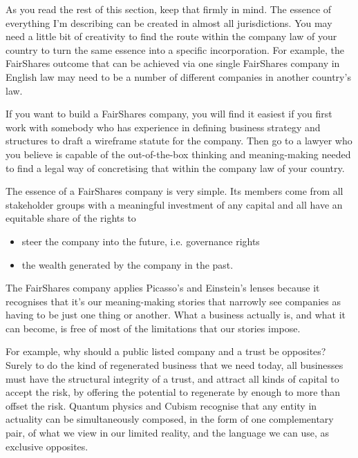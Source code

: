 As you read the rest of this section, keep that firmly in mind. The essence of everything I'm describing can be created in almost all jurisdictions. You may need a little bit of creativity to find the route within the company law of your country to turn the same essence into a specific incorporation. For example, the FairShares outcome that can be achieved via one single FairShares company in English law may need to be a number of different companies in another country's law. 


If you want to build a FairShares company, you will find it easiest if you first work with somebody who has experience in defining business strategy and structures to draft a wireframe statute for the company. Then go to a lawyer who you believe is capable of the out-of-the-box thinking and meaning\hyp{}making needed to find a legal way of concretising that within the company law of your country. 


The essence of a FairShares company is very simple. Its members come from all stakeholder groups with a meaningful investment of any capital and all have an equitable share of the rights to


\begin{itemize}
\item steer the company into the future, i.e. governance rights
\item the wealth generated by the company in the past.
\end{itemize}


The FairShares company applies Picasso's and Einstein's lenses because it recognises that it's our meaning\hyp{}making stories that narrowly see companies as having to be just one thing or another. What a business actually is, and what it can become, is free of most of the limitations that our stories impose.


For example, why should a public listed company and a trust be opposites? Surely to do the kind of regenerated business that we need today, all businesses must have the structural integrity of a trust, and attract all kinds of capital to accept the risk, by offering the potential to regenerate by enough to more than offset the risk. Quantum physics and Cubism recognise that any entity in actuality can be simultaneously composed, in the form of one complementary pair, of what we view in our limited reality, and the language we can use, as exclusive opposites. 


